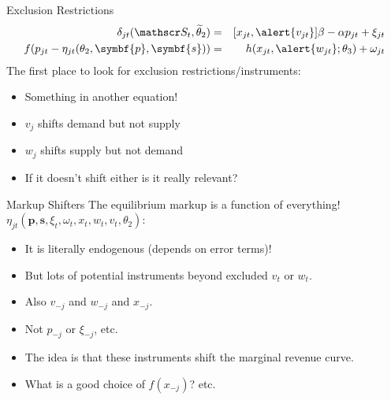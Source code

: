 \documentclass[aspectratio=169,11pt]{beamer}
\begin{document}
\begin{frame}{Exclusion Restrictions}
\begin{eqnarray*}
    \delta_{jt}(\calS_t,\widetilde{\theta}_2) &=&  [x_{jt}, \alert{v_{jt}}]  \beta  - \alpha p_{jt} + \xi_{jt}\\
    f(p_{jt} - \eta_{jt}(\theta_2,\symbf{p},\symbf{s})) &=&   h(x_{jt},\alert{w_{jt}};\theta_3)+\omega_{jt}
\end{eqnarray*}
The first place to look for exclusion restrictions/instruments:
\begin{itemize}
\item Something in another equation!
\item $v_j$ shifts demand but not supply
\item $w_j$ shifts supply but not demand
\item If it doesn't shift either is it really relevant?
\end{itemize}
\end{frame}


\begin{frame}{Markup Shifters}
The equilibrium markup is a function of \alert{everything!} $\eta_{jt}(\symbf{p},\symbf{s},\xi_t,\omega_t,x_{t},w_{t},v_t,\theta_2)$:
\begin{itemize}
\item It is literally \alert{endogenous} (depends on error terms)!
\item But lots of potential instruments beyond \alert{excluded} $v_t$ or $w_t$.
\item Also $v_{-j}$ and $w_{-j}$ and $x_{-j}$.
\item Not $p_{-j}$ or $\xi_{-j}$, etc.
\item The idea is that these instruments shift the \alert{marginal revenue curve}.
\item What is a good choice of $f(x_{-j})$? etc.
\end{itemize}
\end{frame}
\end{document}
